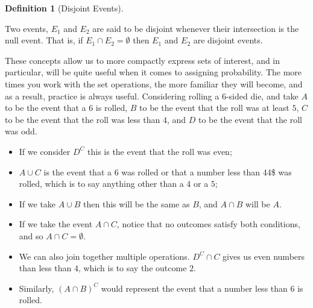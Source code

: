 \documentclass[
  letterpaper,
  DIV=11,
  numbers=noendperiod]{scrreprt}
\providecommand{\tightlist}{%
  \setlength{\itemsep}{0pt}\setlength{\parskip}{0pt}}\usepackage{longtable,booktabs,array}
\theoremstyle{definition}
\newtheorem{definition}{Definition}[chapter]
\theoremstyle{definition}
\theoremstyle{definition}
\theoremstyle{remark}
\begin{document}
\begin{definition}[Disjoint
Events]\protect\hypertarget{def-disjoint-events}{}\label{def-disjoint-events}

Two events, \(E_1\) and \(E_2\) are said to be disjoint whenever their
intersection is the null event. That is, if \(E_1 \cap E_2 = \emptyset\)
then \(E_1\) and \(E_2\) are disjoint events.

\end{definition}

These concepts allow us to more compactly express sets of interest, and
in particular, will be quite useful when it comes to assigning
probability. The more times you work with the set operations, the more
familiar they will become, and as a result, practice is always useful.
Considering rolling a 6-sided die, and take \(A\) to be the event that a
\(6\) is rolled, \(B\) to be the event that the roll was at least \(5\),
\(C\) to be the event that the roll was less than \(4\), and \(D\) to be
the event that the roll was odd.

\begin{itemize}
\tightlist
\item
  If we consider \(D^C\) this is the event that the roll was even;
\item
  \(A \cup C\) is the event that a \(6\) was rolled or that a number
  less than 44\$ was rolled, which is to say anything other than a \(4\)
  or a \(5\);
\item
  If we take \(A \cup B\) then this will be the same as \(B\), and
  \(A\cap B\) will be \(A\).
\item
  If we take the event \(A\cap C\), notice that no outcomes satisfy both
  conditions, and so \(A \cap C = \emptyset\).
\item
  We can also join together multiple operations. \(D^C \cap C\) gives us
  even numbers than less than \(4\), which is to say the outcome \(2\).
\item
  Similarly, \((A \cap B)^C\) would represent the event that a number
  less than \(6\) is rolled.
\end{itemize}
\end{document}
